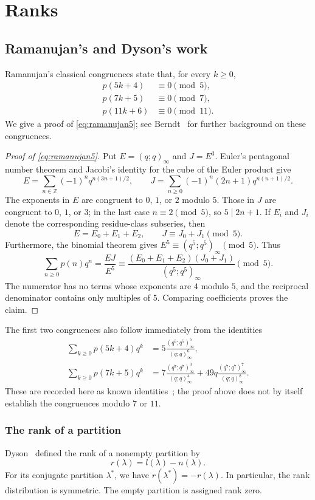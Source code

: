 \chapter{Ranks}
\section{Ramanujan's and Dyson's work}
Ramanujan's classical congruences state that, for every $k\ge0$,
\begin{align}
 p(5k+4)&\equiv0\pmod5,\label{eq:ramanujan5}\\
 p(7k+5)&\equiv0\pmod7,\label{eq:ramanujan7}\\
 p(11k+6)&\equiv0\pmod{11}.\label{eq:ramanujan11}
\end{align}
We give a proof of \eqref{eq:ramanujan5}; see Berndt~\cite{berndt} for
further background on these congruences.
\begin{proof}[Proof of \eqref{eq:ramanujan5}]
Put $E=(q;q)_\infty$ and $J=E^3$. Euler's pentagonal number theorem and
Jacobi's identity for the cube of the Euler product give
\[
 E=\sum_{n\in\mathbb Z}(-1)^nq^{n(3n+1)/2},\qquad
 J=\sum_{n\ge0}(-1)^n(2n+1)q^{n(n+1)/2}.
\]
The exponents in $E$ are congruent to $0$, $1$, or $2$ modulo $5$.
Those in $J$ are congruent to $0$, $1$, or $3$; in the last case
$n\equiv2\pmod5$, so $5\mid2n+1$.
If $E_i$ and $J_i$ denote the corresponding residue-class subseries, then
\[
 E=E_0+E_1+E_2,\qquad J\equiv J_0+J_1\pmod5.
\]
Furthermore, the binomial theorem gives
$E^5\equiv(q^5;q^5)_\infty\pmod5$. Thus
\[
 \sum_{n\ge0}p(n)q^n=\frac{EJ}{E^5}
 \equiv\frac{(E_0+E_1+E_2)(J_0+J_1)}{(q^5;q^5)_\infty}\pmod5.
\]
The numerator has no terms whose exponents are $4$ modulo $5$, and the
reciprocal denominator contains only multiples of $5$. Comparing
coefficients proves the claim.
\end{proof}

The first two congruences also follow immediately from the identities
\begin{align}
 \sum_{k\ge0}p(5k+4)q^k
 &=5\frac{(q^5;q^5)_\infty^5}{(q;q)_\infty^6},\label{eq:p5-dissection}\\
 \sum_{k\ge0}p(7k+5)q^k
 &=7\frac{(q^7;q^7)_\infty^3}{(q;q)_\infty^4}
   +49q\frac{(q^7;q^7)_\infty^7}{(q;q)_\infty^8}.
 \label{eq:p7-dissection}
\end{align}
These are recorded here as known identities~\cite{berndt,berndt2}; the
proof above does not by itself establish the congruences modulo $7$ or $11$.

\subsection{The rank of a partition}
Dyson~\cite{dyson} defined the rank of a nonempty partition by
\[
 r(\lambda)=l(\lambda)-n(\lambda).
\]
For its conjugate partition $\lambda^*$, we have
$r(\lambda^*)=-r(\lambda)$. In particular, the rank distribution is symmetric.
The empty partition is assigned rank zero.

